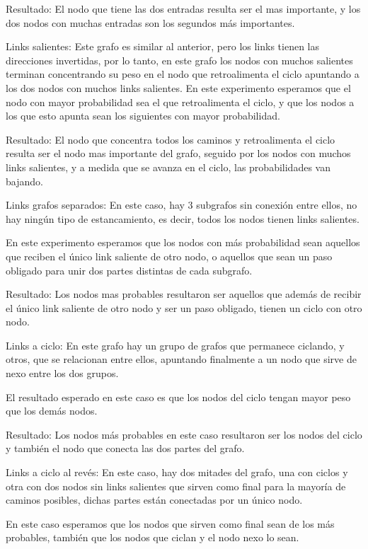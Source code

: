 Resultado: El nodo que tiene las dos entradas resulta ser el mas importante, y los dos nodos con muchas entradas son los segundos m\'as importantes. 

Links salientes: Este grafo es similar al anterior, pero los links tienen las direcciones invertidas, por lo tanto, en este grafo los nodos con muchos salientes terminan concentrando su peso en el nodo que retroalimenta el ciclo apuntando a los dos nodos con muchos links salientes.
En este experimento esperamos que el nodo con mayor probabilidad sea el que retroalimenta el ciclo, y que los nodos a los que esto apunta sean los siguientes con mayor probabilidad.

Resultado: El nodo que concentra todos los caminos y retroalimenta el ciclo resulta ser el nodo mas importante del grafo, seguido por los nodos con muchos links salientes, y a medida que se avanza en el ciclo, las probabilidades van bajando.

Links grafos separados: En este caso, hay 3 subgrafos sin conexi\'on entre ellos, no hay ning\'un tipo de estancamiento, es decir, todos los nodos tienen links salientes.

En este experimento esperamos que los nodos con m\'as probabilidad sean aquellos que reciben el \'unico link saliente de otro nodo, o aquellos que sean un paso obligado para unir dos partes distintas de cada subgrafo.

Resultado: Los nodos mas probables resultaron ser aquellos que adem\'as de recibir el \'unico link saliente de otro nodo y ser un paso obligado, tienen un ciclo con otro nodo.

Links a ciclo: En este grafo hay un grupo de grafos que permanece ciclando, y otros, que se relacionan entre ellos, apuntando finalmente a un nodo que sirve de nexo entre los dos grupos.

El resultado esperado en este caso es que los nodos del ciclo tengan mayor peso que los dem\'as nodos.

Resultado: Los nodos m\'as probables en este caso resultaron ser los nodos del ciclo y tambi\'en el nodo que conecta las dos partes del grafo.

Links a ciclo al rev\'es: En este caso, hay dos mitades del grafo, una con ciclos y otra con dos nodos sin links salientes que sirven como final para la mayor\'ia de caminos posibles, dichas partes est\'an conectadas por un \'unico nodo.

En este caso esperamos que los nodos que sirven como final sean de los m\'as probables, tambi\'en que los nodos que ciclan y el nodo nexo lo sean.

